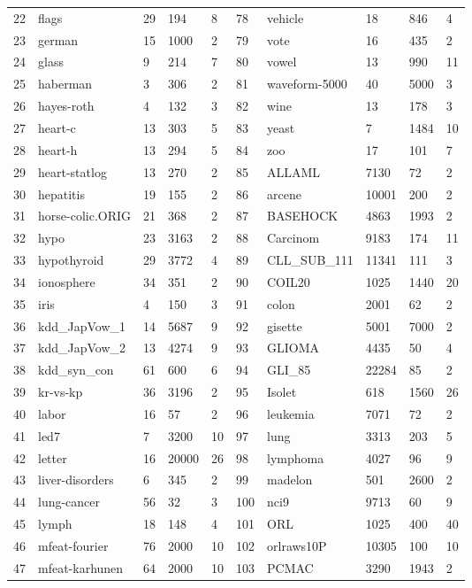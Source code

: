 \documentclass[prodmode,acmtkdd]{acmsmall}
\begin{document}
\begin{table}[!h]
{\begin{threeparttable}
\begin{tabular}{l l l l l | l l l l l}
22 & flags & 29 & 194 & 8 & 78 & vehicle & 18 & 846 & 4\\
23 & german & 15 & 1000 & 2 & 79 & vote & 16 & 435 & 2\\
24 & glass & 9 & 214 & 7 & 80 & vowel & 13 & 990 & 11\\
25 & haberman & 3 & 306 & 2 & 81 & waveform-5000 & 40 & 5000 & 3\\
26 & hayes-roth & 4 & 132 & 3 & 82 & wine & 13 & 178 & 3\\
27 & heart-c & 13 & 303 & 5 & 83 & yeast & 7 & 1484 & 10\\
28 & heart-h & 13 & 294 & 5 & 84 & zoo & 17 & 101 & 7\\
29 & heart-statlog & 13 & 270 & 2 & 85 & ALLAML & 7130 & 72 & 2\\
30 & hepatitis & 19 & 155 & 2 & 86 & arcene & 10001 & 200 & 2\\
31 & horse-colic.ORIG & 21 & 368 & 2 & 87 & BASEHOCK & 4863 & 1993 & 2\\
32 & hypo & 23 & 3163 & 2 & 88 & Carcinom & 9183 & 174 & 11\\
33 & hypothyroid & 29 & 3772 & 4 & 89 & CLL\_SUB\_111 & 11341 & 111 & 3\\
34 & ionosphere & 34 & 351 & 2 & 90 & COIL20 & 1025 & 1440 & 20\\
35 & iris & 4 & 150 & 3 & 91 & colon & 2001 & 62 & 2\\
36 & kdd\_JapVow\_1 & 14 & 5687 & 9 & 92 & gisette & 5001 & 7000 & 2\\
37 & kdd\_JapVow\_2 & 13 & 4274 & 9 & 93 & GLIOMA & 4435 & 50 & 4\\
38 & kdd\_syn\_con & 61 & 600 & 6 & 94 & GLI\_85 & 22284 & 85 & 2\\
39 & kr-vs-kp & 36 & 3196 & 2 & 95 & Isolet & 618 & 1560 & 26\\
40 & labor & 16 & 57 & 2 & 96 & leukemia & 7071 & 72 & 2\\
41 & led7 & 7 & 3200 & 10 & 97 & lung & 3313 & 203 & 5\\
42 & letter & 16 & 20000 & 26 & 98 & lymphoma & 4027 & 96 & 9\\
43 & liver-disorders & 6 & 345 & 2 & 99 & madelon & 501 & 2600 & 2\\
44 & lung-cancer & 56 & 32 & 3 & 100 & nci9 & 9713 & 60 & 9\\
45 & lymph & 18 & 148 & 4 & 101 & ORL & 1025 & 400 & 40\\
46 & mfeat-fourier & 76 & 2000 & 10 & 102 & orlraws10P & 10305 & 100 & 10\\
47 & mfeat-karhunen & 64 & 2000 & 10 & 103 & PCMAC & 3290 & 1943 & 2\\

\end{tabular}
\end{threeparttable}}
\end{table}
\end{document}

